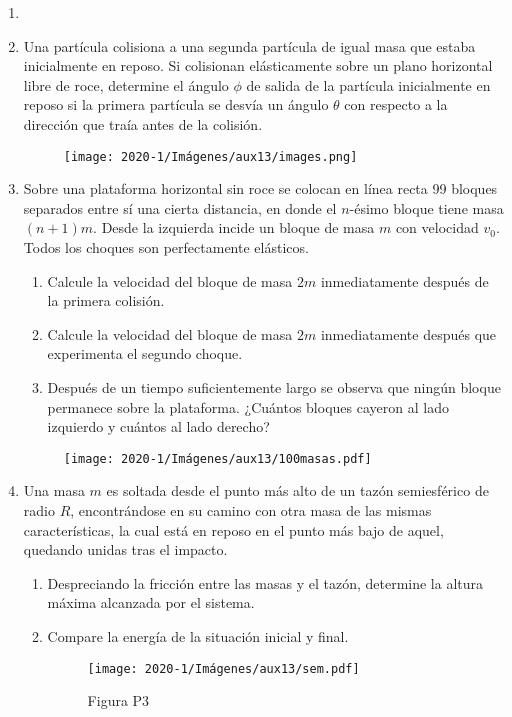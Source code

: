 \documentclass[letterpaper,11pt]{article}
\begin{document}
\vspace{-1cm}
\begin{enumerate}\setlength{\itemsep}{0.4cm}


\item[]

\item Una partícula colisiona a una segunda partícula de igual masa que estaba inicialmente en reposo. Si colisionan elásticamente sobre un plano horizontal libre de roce, determine el ángulo $\phi$ de salida de la partícula inicialmente en reposo si la primera partícula se desvía un ángulo $\theta$ con respecto a la dirección que traía antes de la colisión.

\begin{figure}[h!]
    \centering
    \texttt{[image: 2020-1/Imágenes/aux13/images.png]}
\end{figure}

\item Sobre una plataforma horizontal sin roce se colocan en línea recta 99 bloques separados entre sí una cierta distancia, en donde el $n$-ésimo bloque tiene masa $(n+1) m$. Desde la izquierda incide un bloque de masa $m$ con velocidad $v_0$. Todos los choques son perfectamente elásticos.
    \begin{enumerate}
        \item Calcule la velocidad del bloque de masa $2m$ inmediatamente después de la primera colisión.
        \item Calcule la velocidad del bloque de masa $2m$ inmediatamente después que experimenta el segundo choque.
        \item Después de un tiempo suficientemente largo se observa que ningún bloque permanece sobre la plataforma. ¿Cuántos bloques cayeron al lado izquierdo y cuántos al lado derecho?
    \end{enumerate}

\begin{figure}[h!]
    \centering
    \texttt{[image: 2020-1/Imágenes/aux13/100masas.pdf]}
\end{figure}


\item Una masa $m$ es soltada desde el punto más alto de un tazón semiesférico de radio $R$, encontrándose en su camino con otra masa de las mismas características, la cual está en reposo en el punto más bajo de aquel, quedando unidas tras el impacto. 
\begin{enumerate}
    \item Despreciando la fricción entre las masas y el tazón, determine la altura máxima alcanzada por el sistema. 
    \item Compare la energía de la situación inicial y final.
    
    \begin{figure}[h!]
    \centering
        \texttt{[image: 2020-1/Imágenes/aux13/sem.pdf]}
        \caption*{Figura P3}

\end{figure}
\end{enumerate}

\end{enumerate}
\end{document}

